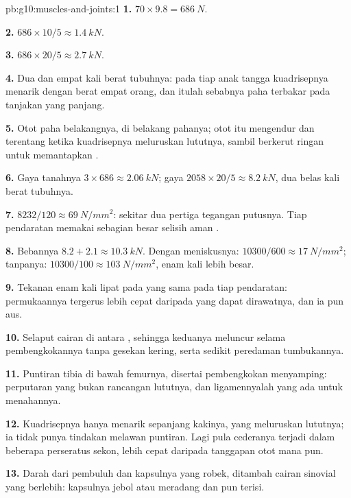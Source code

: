 \begin{solution}{pb:g10:muscles-and-joints:1}
\textbf{1.} $70 \times 9.8 = \qty{686}{N}$.

\textbf{2.} $686 \times 10/5 \approx \qty{1.4}{kN}$.

\textbf{3.} $686 \times 20/5 \approx \qty{2.7}{kN}$.

\textbf{4.} Dua dan empat kali berat tubuhnya: pada tiap anak tangga
kuadrisepnya menarik dengan berat empat orang, dan itulah sebabnya paha
terbakar pada tanjakan yang panjang.

\textbf{5.} Otot paha belakangnya, di belakang pahanya; otot itu
mengendur dan terentang ketika kuadrisepnya meluruskan lututnya, sambil
berkerut ringan untuk memantapkan .

\textbf{6.} Gaya tanahnya $3 \times 686 \approx \qty{2.06}{kN}$; gaya
 $2058 \times 20/5 \approx \qty{8.2}{kN}$, dua belas kali
berat tubuhnya.

\textbf{7.} $8232/120 \approx \qty{69}{N/mm^2}$: sekitar dua pertiga
tegangan putusnya. Tiap pendaratan memakai sebagian besar selisih aman
.

\textbf{8.} Bebannya $8.2 + 2.1 \approx \qty{10.3}{kN}$. Dengan
meniskusnya: $10300/600 \approx \qty{17}{N/mm^2}$; tanpanya: $10300/100 \approx
\qty{103}{N/mm^2}$, enam kali lebih besar.

\textbf{9.} Tekanan enam kali lipat pada  yang sama pada
tiap pendaratan: permukaannya tergerus lebih cepat daripada yang dapat
dirawatnya, dan ia pun aus.

\textbf{10.} Selaput cairan di antara , sehingga
keduanya meluncur selama pembengkokannya tanpa gesekan kering, serta
sedikit peredaman tumbukannya.

\textbf{11.} Puntiran tibia di bawah femurnya, disertai pembengkokan
menyamping: perputaran yang bukan rancangan lututnya, dan ligamennyalah
yang ada untuk menahannya.

\textbf{12.} Kuadrisepnya hanya menarik sepanjang kakinya, yang
meluruskan lututnya; ia tidak punya tindakan melawan puntiran. Lagi
pula cederanya terjadi dalam beberapa perseratus sekon, lebih cepat
daripada tanggapan otot mana pun.

\textbf{13.} Darah dari pembuluh  dan kapsulnya yang robek,
ditambah cairan sinovial yang berlebih: kapsulnya jebol atau meradang
dan  pun terisi.


\end{solution}
